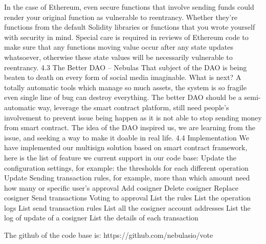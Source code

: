 In the case of Ethereum, even secure functions that involve sending funds could render your original function as vulnerable to reentrancy. Whether they're functions from the default Solidity libraries or functions that you wrote yourself with security in mind. Special care is required in reviews of Ethereum code to make sure that any functions moving value occur after any state updates whatsoever, otherwise these state values will be necessarily vulnerable to reentrancy.
4.3 The Better DAO -- Nebulas
That subject of the DAO is being beaten to death on every form of social media imaginable. What is next? A totally automatic tools which manage so much assets, the system is so fragile even single line of bug can destroy everything. The better DAO should be a semi-automatic way, leverage the smart contract platform, still need people’s involvement to prevent issue being happen as it is not able to stop sending money from smart contract. The idea of the DAO inspired us, we are learning from the issue, and seeking a way to make it doable in real life.
4.4 Implementation
We have implemented our multisign solution based on smart contract framework, here is the list of feature we current support in our code base:
Update the configuration settings, for example: the thresholds for each different operation
Update Sending transaction rules, for example, more than which amount need how many or specific user’s approval
Add cosigner
Delete cosigner
Replace cosigner
Send transactions
Voting to approval
List the rules
List the operation logs
List send transaction rules
List all the cosigner account addresses
List the log of update of a cosigner
List the details of each transaction

The github of the code base is: https://github.com/nebulasio/vote
